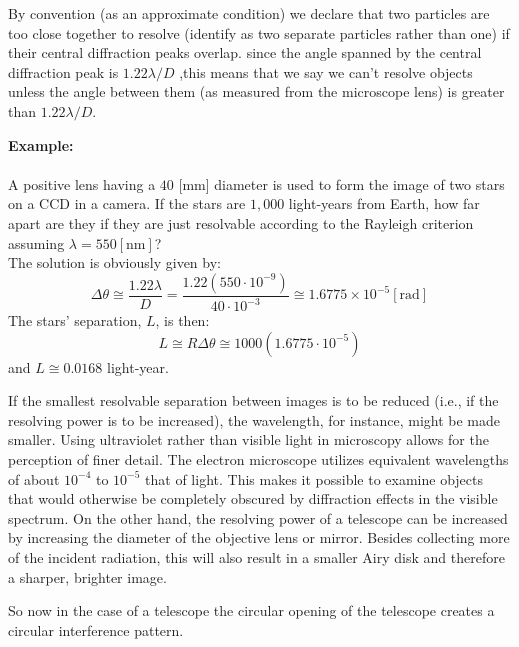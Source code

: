 	By convention (as an approximate condition) we declare that two particles are too close together to resolve (identify as two separate particles rather than one) if their central diffraction peaks overlap. since the angle spanned by the central diffraction peak is $1.22 \lambda / D$ ,this means that we say we can't resolve objects unless the angle between them (as measured from the microscope lens) is greater than $1.22 \lambda / D$.
	
	\begin{tcolorbox}[colframe=black,colback=white,sharp corners]
	\textbf{{\Large {}}Example:}\\\\
	A positive lens having a $40$ [mm] diameter is used to form the image of two stars on a CCD in a camera. If the stars are $1,000$ light-years from Earth, how far apart are they if they are just resolvable according to the Rayleigh criterion assuming $\lambda=550 [\mathrm{nm}]$?\\
	
	The solution is obviously given by:
	$$
	\Delta \theta\cong \dfrac{1.22\lambda}{D}=\dfrac{1.22\left(550 \cdot 10^{-9}\right)}{40 \cdot 10^{-3}}\cong 1.6775 \times 10^{-5} [\mathrm{rad}]
	$$
	The stars' separation, $L$, is then:
	$$
	L\cong R\Delta \theta\cong 1000\left(1.6775 \cdot 10^{-5}\right)
	$$
	and $L\cong 0.0168$ light-year.
	\end{tcolorbox}
	If the smallest resolvable separation between images is to be reduced (i.e., if the resolving power is to be increased), the wavelength, for instance, might be made smaller. Using ultraviolet rather than visible light in microscopy allows for the perception of finer detail. The electron microscope utilizes equivalent wavelengths of about $10^{-4}$ to $10^{-5}$ that of light. This makes it possible to examine objects that would otherwise be completely obscured by diffraction effects in the visible spectrum. On the other hand, the resolving power of a telescope can be increased by increasing the diameter of the objective lens or mirror. Besides collecting more of the incident radiation, this will also result in a smaller Airy disk and therefore a sharper, brighter image.
	
	So now in the case of a telescope the circular opening of the telescope creates a circular interference pattern.

